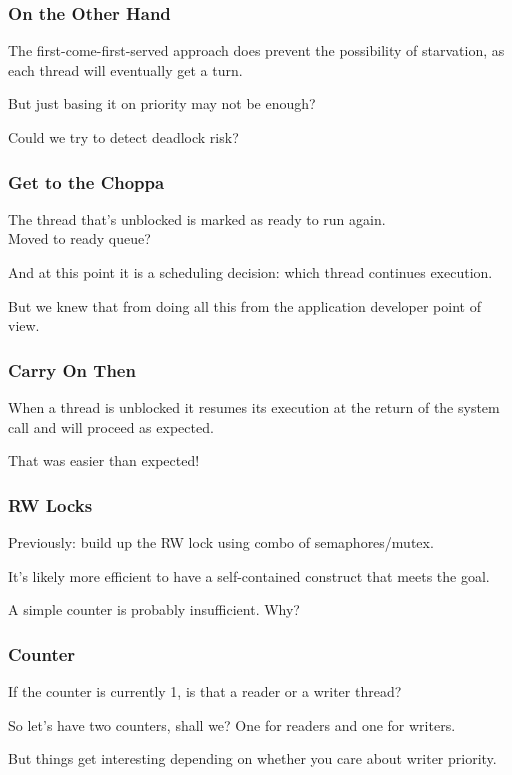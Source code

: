 \begin{frame}
\frametitle{On the Other Hand}

The first-come-first-served approach does prevent the possibility of starvation, as each thread will eventually get a turn.

But just basing it on priority may not be enough?

Could we try to detect deadlock risk?

\end{frame}

\begin{frame}
\frametitle{Get to the Choppa}

The thread that's unblocked is marked as ready to run again.\\
\quad Moved to ready queue?

And at this point it is a scheduling decision: which thread continues execution. 

But we knew that from doing all this from the application developer point of view.

\end{frame}

\begin{frame}
\frametitle{Carry On Then}

When a thread is unblocked it resumes its execution at the return of the system call and will proceed as expected.

That was easier than expected!

\end{frame}

\begin{frame}
\frametitle{RW Locks}

Previously: build up the RW lock using combo of semaphores/mutex.


It's likely more efficient to have a self-contained construct that meets the goal.

A simple counter is probably insufficient. Why?

\end{frame}

\begin{frame}
\frametitle{Counter}

If the counter is currently 1, is that a reader or a writer thread?

So let's have two counters, shall we? One for readers and one for writers.

But things get interesting depending on whether you care about writer priority.

\end{frame}

